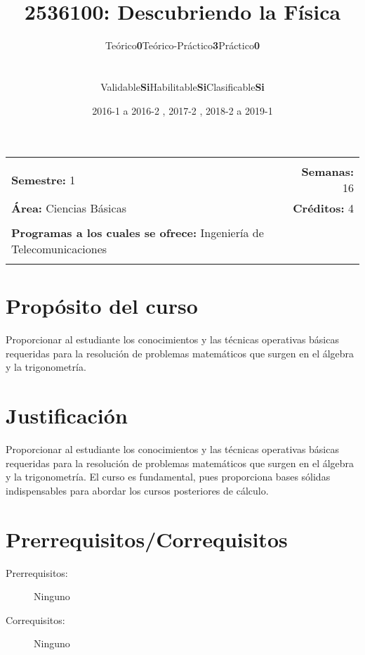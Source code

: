 \documentclass[11pt]{article}
\title{2536100: Descubriendo la Física}
\author{\begin{tabular} {c|c|c|c|c|c} Teórico & \textbf{0} & Teórico-Práctico & \textbf{3} & Práctico & \textbf{0}\end{tabular}
\\
\begin{tabular} {c|c|c|c|c|c} Validable & \textbf{Si} & Habilitable & \textbf{Si} & Clasificable & \textbf{Si}\end{tabular}}
\date{2016-1 a 2016-2 , 2017-2 , 2018-2 a 2019-1}
\newcommand{\blankline}{\quad\pagebreak[2]}
\begin{document}
\maketitle

\begin{tabular*}{.93\textwidth}{@{\extracolsep{\fill}}lr}
\hline\\

\textbf{Semestre:} 1 & \textbf{Semanas:} 16
\\
\textbf{Área:} Ciencias Básicas &    \textbf{Créditos:} 4 
\\ & \\
\textbf{Programas a los cuales se ofrece:} Ingeniería de Telecomunicaciones
\\ & \\
\hline
\end{tabular*}

\vspace{5 mm}

\section*{Propósito del curso}

Proporcionar al estudiante los conocimientos y las técnicas operativas básicas requeridas para la resolución de problemas matemáticos que surgen en el álgebra y la trigonometría.



\section*{Justificación}

Proporcionar al estudiante los conocimientos y las técnicas operativas básicas requeridas para la resolución de problemas matemáticos que surgen en el álgebra y la trigonometría. El curso es fundamental, pues proporciona bases sólidas indispensables para abordar los cursos posteriores de cálculo.

\section*{Prerrequisitos/Correquisitos}
\begin{description}
\item [Prerrequisitos:] Ninguno
\item[Correquisitos:] Ninguno
\end{description}
\end{document}
